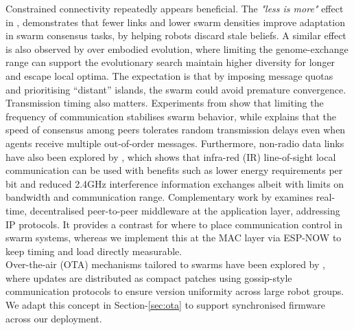 \documentclass[conference]{IEEEtran}
\begin{document}
Constrained connectivity repeatedly appears beneficial. The \emph{"less is more"} effect in \cite{talamali_when_2021}, demonstrates that fewer links and lower swarm densities improve adaptation in swarm consensus tasks, by helping robots discard stale beliefs. A similar effect is also observed by \cite{hiraga_when_2023} over embodied evolution, where limiting the genome-exchange range can support the evolutionary search maintain higher diversity for longer and escape local optima. The expectation is that by imposing message quotas and prioritising “distant” islands, the swarm could avoid premature convergence.\\

Transmission timing also matters. Experiments from \cite{aust_hidden_2022} show that limiting the frequency of communication stabilises swarm behavior, while \cite{tsianos_impact_2012} explains that the speed of consensus among peers tolerates random transmission delays even when agents receive multiple out-of-order messages. Furthermore, non-radio data links have also been explored by \cite{trenkwalder_swarmcom_2020}, which shows that infra-red (IR) line-of-sight local communication can be used with benefits such as lower energy requirements per bit and reduced 2.4GHz interference information exchanges albeit with limits on bandwidth and communication range. Complementary work by \cite{rabbah_real_2021} examines real-time, decentralised peer-to-peer middleware at the application layer, addressing IP protocols. It provides a contrast for where to place communication control in swarm systems, whereas we implement this at the MAC layer via ESP-NOW to keep timing and load directly measurable.\\

Over-the-air (OTA) mechanisms tailored to swarms have been explored by \cite{varadharajan_over--air_2018}, where updates are distributed as compact patches using gossip-style communication protocols to ensure version uniformity across large robot groups. We adapt this concept in Section-\ref{sec:ota} to support synchronised firmware across our deployment.\\


\end{document}
